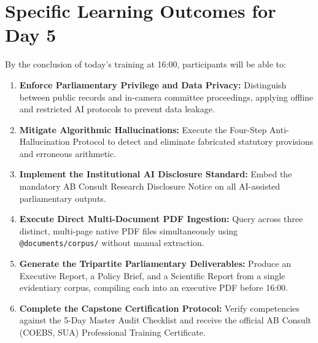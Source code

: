 \documentclass[11pt, a4paper]{report}
\begin{document}
\section{Specific Learning Outcomes for Day 5}
By the conclusion of today's training at 16:00, participants will be able to:
\begin{enumerate}[label=\textbf{5.\arabic*}]
    \item \textbf{Enforce Parliamentary Privilege and Data Privacy:} Distinguish between public records and in-camera committee proceedings, applying offline and restricted AI protocols to prevent data leakage.
    \item \textbf{Mitigate Algorithmic Hallucinations:} Execute the Four-Step Anti-Hallucination Protocol to detect and eliminate fabricated statutory provisions and erroneous arithmetic.
    \item \textbf{Implement the Institutional AI Disclosure Standard:} Embed the mandatory AB Consult Research Disclosure Notice on all AI-assisted parliamentary outputs.
    \item \textbf{Execute Direct Multi-Document PDF Ingestion:} Query across three distinct, multi-page native PDF files simultaneously using \texttt{@documents/corpus/} without manual extraction.
    \item \textbf{Generate the Tripartite Parliamentary Deliverables:} Produce an Executive Report, a Policy Brief, and a Scientific Report from a single evidentiary corpus, compiling each into an executive PDF before 16:00.
    \item \textbf{Complete the Capstone Certification Protocol:} Verify competencies against the 5-Day Master Audit Checklist and receive the official AB Consult (COEBS, SUA) Professional Training Certificate.
\end{enumerate}
\end{document}
